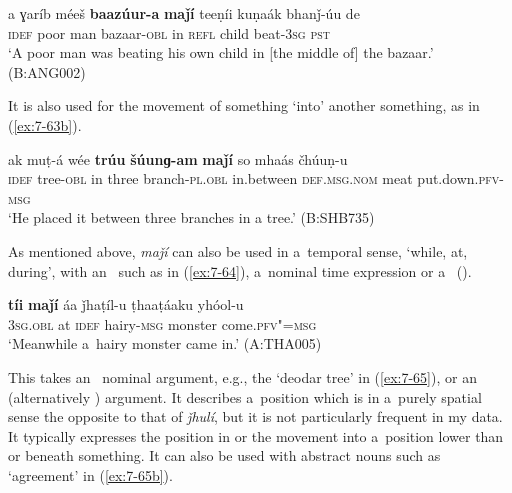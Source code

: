 \begin{exe}
\ex
\label{ex:7-63}
\gll a ɣaríb méeš \textbf{baazúur-a} \textbf{maǰí} teeṇíi kuṇaák bhanǰ-úu de \\
\textsc{idef} poor man bazaar-\textsc{obl} in \textsc{refl} child beat-\textsc{3sg} \textsc{pst} \\
\glt `A poor man was beating his own child in [the middle of] the bazaar.' (B:ANG002)
\end{exe}

It is also used for the movement of something `into' another something, as in (\ref{ex:7-63b}).

\begin{exe}
\ex
\label{ex:7-63b}
\gll ak muṭ-á wée \textbf{trúu} \textbf{šúunɡ-am} \textbf{maǰí} so mhaás čhúuṇ-u \\
\textsc{idef} tree-\textsc{obl} in three branch-\textsc{pl.obl} in.between \textsc{def.msg.nom} meat put.down.\textsc{pfv-msg} \\
\glt `He placed it between three branches in a tree.' (B:SHB735)
\end{exe}

As mentioned above, \textit{maǰí} can also be used in a~temporal sense, `while, at, during', with an~  such as in (\ref{ex:7-64}), a~nominal time expression or a~ ().

\begin{exe}
\ex
\label{ex:7-64}
\gll \textbf{tíi} \textbf{maǰí} áa ǰhaṭíl-u ṭhaaṭáaku yhóol-u \\
\textsc{3sg.obl} at \textsc{idef} hairy-\textsc{msg} monster come.\textsc{pfv"=msg} \\
\glt `Meanwhile a~hairy monster came in.' (A:THA005)
\end{exe}

 This  takes an~ nominal argument, e.g., the `deodar tree' in (\ref{ex:7-65}), or an~ (alternatively )  argument. It describes a~position which is in a~purely spatial sense the opposite to that of \textit{ǰhulí}, but it is not particularly frequent in my data. It typically expresses the position in or the movement into a~position lower than or beneath something. It can also be used with abstract nouns such as `agreement' in  (\ref{ex:7-65b}).


